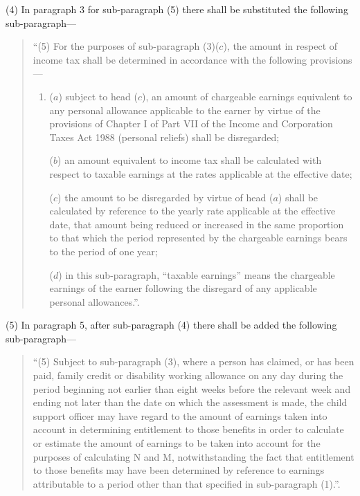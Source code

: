\documentclass[12pt,a4paper]{article}
\begin{document}
(4) In paragraph 3 for sub-paragraph (5) there shall be substituted the following sub-paragraph—
\begin{quotation}
“(5) For the purposes of sub-paragraph (3)($c$), the amount in respect of income tax shall be determined in accordance with the following provisions—
\begin{enumerate}\item[]
($a$) subject to head ($c$), an amount of chargeable earnings equivalent to any personal allowance applicable to the earner by virtue of the provisions of Chapter I of Part VII of the Income and Corporation Taxes Act 1988 (personal reliefs) shall be disregarded;

($b$) an amount equivalent to income tax shall be calculated with respect to taxable earnings at the rates applicable at the effective date;

($c$) the amount to be disregarded by virtue of head ($a$) shall be calculated by reference to the yearly rate applicable at the effective date, that amount being reduced or increased in the same proportion to that which the period represented by the chargeable earnings bears to the period of one year;

($d$) in this sub-paragraph, “taxable earnings” means the chargeable earnings of the earner following the disregard of any applicable personal allowances.”.
\end{enumerate}
\end{quotation}

(5) In paragraph 5, after sub-paragraph (4) there shall be added the following sub-paragraph—
\begin{quotation}
\begin{sloppypar}
“(5) Subject to sub-paragraph (3), where a person has claimed, or has been paid, family credit or disability working allowance on any day during the period beginning not earlier than eight weeks before the relevant week and ending not later than the date on which the assessment is made, the child support officer may have regard to the amount of earnings taken into account in determining entitlement to those benefits in order to calculate or estimate the amount of earnings to be taken into account for the purposes of calculating N and M, notwithstanding the fact that entitlement to those benefits may have been determined by reference to earnings attributable to a period other than that specified in sub-paragraph (1).”.
\end{sloppypar}
\end{quotation}
\end{document}
